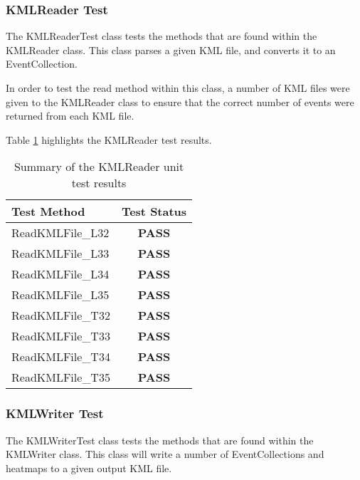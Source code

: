 \subsubsection{KMLReader Test}

The {\ttfamily KMLReaderTest} class tests the methods that are found within the
KMLReader class. This class parses a given KML file, and converts it to an
EventCollection.

In order to test the read method within this class, a number of KML files were 
given to the {\ttfamily KMLReader} class to ensure that the correct number of 
events were returned from each KML file.

Table \ref{tab:kml_reader_test} highlights the KMLReader test results.

\begin{table}[h]
  \centering
  \begin{tabular}{|l|c|}
    \hline
    {\bfseries Test Method} & {\bfseries Test Status} \\ 
    \hline
    ReadKMLFile\_L32        & {\bfseries \color{OliveGreen} PASS}   \\ 
    ReadKMLFile\_L33        & {\bfseries \color{OliveGreen} PASS}   \\ 
    ReadKMLFile\_L34        & {\bfseries \color{OliveGreen} PASS}   \\ 
    ReadKMLFile\_L35        & {\bfseries \color{OliveGreen} PASS}   \\ 
    ReadKMLFile\_T32        & {\bfseries \color{OliveGreen} PASS}   \\ 
    ReadKMLFile\_T33        & {\bfseries \color{OliveGreen} PASS}   \\ 
    ReadKMLFile\_T34        & {\bfseries \color{OliveGreen} PASS}   \\ 
    ReadKMLFile\_T35        & {\bfseries \color{OliveGreen} PASS}   \\
    \hline
  \end{tabular}
  \caption[Summary of the KMLReader unit test results]
          {Summary of the KMLReader unit test results}
  \label{tab:kml_reader_test}
\end{table}


\subsubsection{KMLWriter Test}

The {\ttfamily KMLWriterTest} class tests the methods that are found within the
KMLWriter class. This class will write a number of EventCollections and 
heatmaps to a given output KML file.


